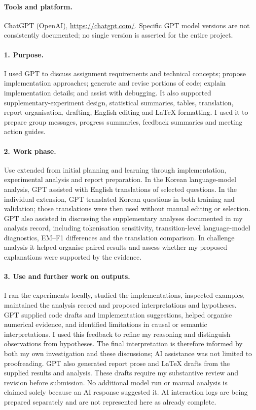 \documentclass[11pt]{article}
\begin{document}
\paragraph{Tools and platform.}
ChatGPT (OpenAI), \url{https://chatgpt.com/}. Specific GPT model versions are not consistently documented; no single version is asserted for the entire project.

\paragraph{1. Purpose.}
I used GPT to discuss assignment requirements and technical concepts; propose implementation approaches; generate and revise portions of code; explain implementation details; and assist with debugging. It also supported supplementary-experiment design, statistical summaries, tables, translation, report organisation, drafting, English editing and LaTeX formatting. I used it to prepare group messages, progress summaries, feedback summaries and meeting action guides.

\paragraph{2. Work phase.}
Use extended from initial planning and learning through implementation, experimental analysis and report preparation. In the Korean language-model analysis, GPT assisted with English translations of selected questions. In the individual extension, GPT translated Korean questions in both training and validation; those translations were then used without manual editing or selection. GPT also assisted in discussing the supplementary analyses documented in my analysis record, including tokenisation sensitivity, transition-level language-model diagnostics, EM--F1 differences and the translation comparison. In challenge analysis it helped organise paired results and assess whether my proposed explanations were supported by the evidence.

\paragraph{3. Use and further work on outputs.}
I ran the experiments locally, studied the implementations, inspected examples, maintained the analysis record and proposed interpretations and hypotheses. GPT supplied code drafts and implementation suggestions, helped organise numerical evidence, and identified limitations in causal or semantic interpretations. I used this feedback to refine my reasoning and distinguish observations from hypotheses. The final interpretation is therefore informed by both my own investigation and these discussions; AI assistance was not limited to proofreading. GPT also generated report prose and LaTeX drafts from the supplied results and analysis. These drafts require my substantive review and revision before submission. No additional model run or manual analysis is claimed solely because an AI response suggested it. AI interaction logs are being prepared separately and are not represented here as already complete.
\end{document}
